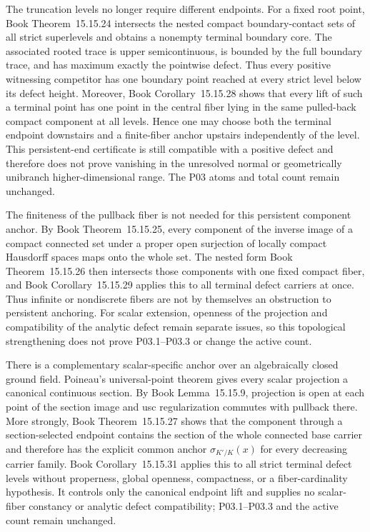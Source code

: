 \documentclass[11pt,a4paper]{article}
\theoremstyle{definition}
\theoremstyle{remark}
\begin{document}
The truncation levels no longer require different endpoints.
For a fixed root point,
Book Theorem~15.15.24 intersects the nested
compact boundary-contact sets of all strict superlevels and obtains a
nonempty terminal boundary core.  The associated rooted trace is upper
semicontinuous, is bounded by the full boundary trace, and has maximum
exactly the pointwise defect.  Thus every positive witnessing competitor has
one boundary point reached at every strict level below its defect height.
Moreover,
Book Corollary~15.15.28 shows that every lift
of such a terminal point has one point in the central fiber lying in the
same pulled-back compact component at all levels.  Hence one may choose
both the terminal endpoint downstairs and a finite-fiber anchor upstairs
independently of the level.  This persistent-end certificate is still
compatible with a positive defect and therefore does not prove vanishing in
the unresolved normal or geometrically unibranch higher-dimensional range.
The P03 atoms and total count remain unchanged.

The finiteness of the pullback fiber is not needed for this persistent
component anchor.  By
Book Theorem~15.15.25, every component of the
inverse image of a compact connected set under a proper open surjection of
locally compact Hausdorff spaces maps onto the whole set.  The nested form
Book Theorem~15.15.26 then intersects those
components with one fixed compact fiber, and
Book Corollary~15.15.29 applies this to all
terminal defect carriers at once.  Thus infinite or nondiscrete fibers are
not by themselves an obstruction to persistent anchoring.  For scalar
extension, openness of the projection and compatibility of the analytic
defect remain separate issues, so this topological strengthening does not
prove P03.1--P03.3 or change the active count.

There is a complementary scalar-specific anchor over an algebraically closed
ground field.  Poineau's universal-point theorem gives every scalar projection
a canonical continuous section.  By
Book Lemma~15.15.9, projection is open at
each point of the section image and usc regularization commutes with pullback
there.  More strongly,
Book Theorem~15.15.27 shows that the
component through a section-selected endpoint contains the section of the
whole connected base carrier and therefore has the explicit common anchor
\(\sigma_{K'/K}(x)\) for every decreasing carrier family.
Book Corollary~15.15.31 applies this to all
strict terminal defect levels without properness, global openness, compactness,
or a fiber-cardinality hypothesis.  It controls only the canonical endpoint
lift and supplies no scalar-fiber constancy or analytic defect compatibility;
P03.1--P03.3 and the active count remain unchanged.
\end{document}
